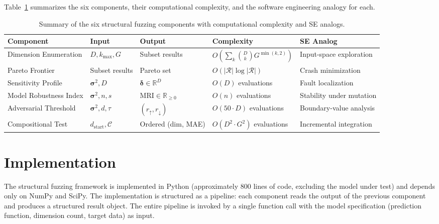 \documentclass[manuscript,review,anonymous]{acmart}
\newcommand{\MRI}{\mathrm{MRI}}
\begin{document}
Table~\ref{tab:algorithm_summary} summarizes the six components, their computational complexity, and the software engineering analogy for each.

\begin{table}[t]
\centering
\caption{Summary of the six structural fuzzing components with computational complexity and SE analogs.}
\label{tab:algorithm_summary}
\small
\begin{tabular}{@{}lllll@{}}
\toprule
\textbf{Component} & \textbf{Input} & \textbf{Output} & \textbf{Complexity} & \textbf{SE Analog} \\
\midrule
Dimension Enumeration & $D, k_{\max}, G$ & Subset results & $O\!\left(\sum_k \binom{D}{k} G^{\min(k,2)}\right)$ & Input-space exploration \\[3pt]
Pareto Frontier & Subset results & Pareto set & $O(|\mathcal{R}| \log |\mathcal{R}|)$ & Crash minimization \\[3pt]
Sensitivity Profile & $\boldsymbol{\sigma}^2, D$ & $\boldsymbol{\delta} \in \mathbb{R}^D$ & $O(D)$ evaluations & Fault localization \\[3pt]
Model Robustness Index & $\boldsymbol{\sigma}^2, n, s$ & $\MRI \in \mathbb{R}_{\geq 0}$ & $O(n)$ evaluations & Stability under mutation \\[3pt]
Adversarial Threshold & $\boldsymbol{\sigma}^2, d, \tau$ & $(r_{\uparrow}, r_{\downarrow})$ & $O(50 \cdot D)$ evaluations & Boundary-value analysis \\[3pt]
Compositional Test & $d_{\mathrm{start}}, \mathcal{C}$ & Ordered (dim, MAE) & $O(D^2 \cdot G^2)$ evaluations & Incremental integration \\
\bottomrule
\end{tabular}
\end{table}


\section{Implementation}
\label{sec:implementation}

The structural fuzzing framework is implemented in Python (approximately 800 lines of code, excluding the model under test) and depends only on NumPy and SciPy.
The implementation is structured as a pipeline: each component reads the output of the previous component and produces a structured result object.
The entire pipeline is invoked by a single function call with the model specification (prediction function, dimension count, target data) as input.
\end{document}
